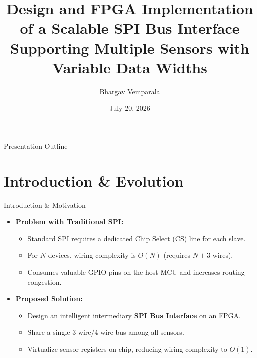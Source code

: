 \documentclass{beamer}
\title[Scalable SPI Bus Interface]{Design and FPGA Implementation of a Scalable SPI Bus Interface Supporting Multiple Sensors with Variable Data Widths}
\author{Bhargav Vemparala}
\institute[Evaluation Board]{Department of Electrical and Computer Engineering \\ University Evaluation Board}
\date{July 20, 2026}
\begin{document}
\begin{frame}
  \titlepage
\end{frame}

\begin{frame}{Presentation Outline}
  \tableofcontents
\end{frame}

\section{Introduction \& Evolution}

\begin{frame}{Introduction \& Motivation}
  \begin{itemize}
    \item \textbf{Problem with Traditional SPI:} 
    \begin{itemize}
      \item Standard SPI requires a dedicated Chip Select (CS) line for each slave.
      \item For $N$ devices, wiring complexity is $O(N)$ (requires $N+3$ wires).
      \item Consumes valuable GPIO pins on the host MCU and increases routing congestion.
    \end{itemize}
    \item \textbf{Proposed Solution:}
    \begin{itemize}
      \item Design an intelligent intermediary \textbf{SPI Bus Interface} on an FPGA.
      \item Share a single 3-wire/4-wire bus among all sensors.
      \item Virtualize sensor registers on-chip, reducing wiring complexity to $O(1)$.
    \end{itemize}
  \end{itemize}
\end{frame}
\end{document}
